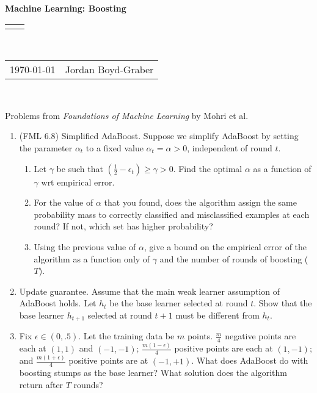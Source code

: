 \documentclass[12pt]{article}
\renewcommand{\title}[1]{\textbf{#1}\\}
\renewcommand{\line}{\begin{tabularx}{\textwidth}{X>{\raggedleft}X}\hline\\\end{tabularx}\\[-0.5cm]}
\newcommand{\leftright}[2]{\begin{tabularx}{\textwidth}{X>{\raggedleft}X}#1%
& #2\\\end{tabularx}\\[-0.5cm]}
\begin{document}
\title{Machine Learning: Boosting}
\line
\leftright{\today}{Jordan Boyd-Graber} %

\begin{center}
  Problems from \emph{Foundations of Machine Learning} by Mohri et al.
\end{center}

\begin{enumerate}
  \item (FML 6.8) Simplified AdaBoost.  Suppose we simplify AdaBoost by setting
    the parameter $\alpha_t$ to a fixed value $\alpha_t = \alpha> 0$,
    independent of round $t$.
    \begin{enumerate}
      \item Let $\gamma$ be such that $\left(\frac{1}{2} - \epsilon_t \right)
        \geq \gamma > 0$.  Find the optimal $\alpha$ as a function of $\gamma$
        wrt empirical error.

     \item For the value of $\alpha$ that you found, does the algorithm assign
       the same probability mass to correctly classified and misclassified
       examples at each round?  If not, which set has higher probability?

     \item Using the previous value of $\alpha$, give a bound on the empirical
       error of the algorithm as a function only of $\gamma$ and the number of
       rounds of boosting ($T$).
    \end{enumerate}

    \item Update guarantee.  Assume that the main weak learner assumption of
      AdaBoost holds.  Let $h_t$ be the base learner selected at round $t$.  Show
      that the base learner $h_{t+1}$ selected at round $t+1$ must be different
      from $h_t$.

    \item Fix $\epsilon \in (0, .5)$.  Let the training data be $m$
      points.  $\frac{m}{4}$ negative points are each at $(1,1)$ and
      $(-1, -1)$; $\frac{m (1 - \epsilon)}{4}$ positive points are each at $(1,
      -1)$; and $\frac{m (1 + \epsilon)}{4}$ positive points are at $(-1, +1)$.
      What does AdaBoost do with boosting stumps as the base learner?
      What solution does the algorithm return after $T$ rounds?

\end{enumerate}
\end{document}
